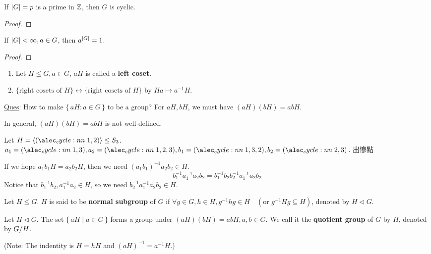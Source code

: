 \begin{coro}
  If $\lvert G\rvert = p$ is a prime in $\mathbb{Z}$, then $G$ is cyclic.
  \begin{proof}
  \end{proof}
\end{coro}

\begin{coro}
  If $\lvert G\rvert < \infty, a \in G$, then $a^{\lvert G\rvert} = 1$.
  \begin{proof}
  \end{proof}
\end{coro}

\begin{remark} \mbox{}
  \begin{enumerate}
    \item Let $H \le G, a \in G$, $aH$ is called a {\bf left coset}.
    \item $\{ \text{right cosets of $H$} \} \leftrightarrow
      \{ \text{right cosets of $H$} \}$ by $Ha \mapsto a^{-1}H$.
  \end{enumerate}
\end{remark}

\underline{Ques}: How to make $\{\, aH : a \in G \,\}$ to be a group?
For $aH, bH$, we must have $(aH)(bH) = abH$.

In general, $(aH)(bH) = abH$ is not well-defined.

\begin{example}
  Let $H = \gen{\cycle{1,2}} \le S_3$. $a_1 = \cycle{1,3}, a_2 = \cycle{1,2,3},
b_1 = \cycle{1,3,2}, b_2 = \cycle{2,3}$. 出慘點
\end{example}

If we hope $a_1b_1H = a_2b_2H$, then we need $(a_1b_1)^{-1}a_2b_2 \in H$.
\[
  b_1^{-1}a_1^{-1}a_2b_2 = b_1^{-1}b_2b_2^{-1}a_1^{-1}a_2b_2
\]
Notice that $b_1^{-1}b_2, a_1^{-1}a_2 \in H$, so we need
$b_2^{-1}a_1^{-1}a_2b_2 \in H$.

\begin{definition}
  Let $H \le G$. $H$ is said to be {\bf normal subgroup} of $G$ if
  $\forall g \in G, h \in H, g^{-1}hg \in H \quad
  (\text{or~} g^{-1}Hg \subseteq H)$, denoted by $H \lhd G$.
\end{definition}

\begin{definition}
  Let $H \lhd G$. The set $\{\, aH \mid a \in G \,\}$ forms a group under
  $(aH)(bH) = abH, a,b \in G$. We call it the {\bf quotient group}
  of $G$ by $H$, denoted by ${G}/{H}$.

  (Note: The indentity is $H = hH$ and $(aH)^{-1} = a^{-1}H$.)
\end{definition}

